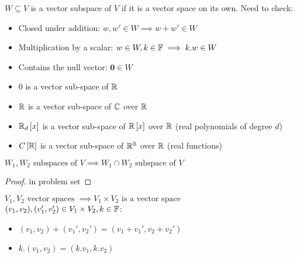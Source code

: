 \begin{definition}
	$W \subseteq V$ is a vector subspace of $V$ if it is a vector space on its own.
	Need to check:
	\begin{itemize}
		\item Closed under addition: $w,w' \in W \implies w+w' \in W$
		\item Multiplication by a scalar: $w \in W, k \in \mathbb{F} \implies k.w \in W$
		\item Contains the null vector: $\textbf{0} \in W$
	\end{itemize}
\end{definition}
\begin{example}
	\begin{itemize}
		\item $0$ is a vector sub-space of $\mathbb{R}$
		\item $\mathbb{R}$ is a vector sub-space of $\mathbb{C}$ over $\mathbb{R}$
		\item $\mathbb{R}_d\left[x\right]$ is a vector sub-space of $\mathbb{R}\left[x\right]$ over $\mathbb{R}$ (real polynomials of degree $d$)
		\item $C\left[ \mathbb{R}\right]$ is a vector sub-space of $\mathbb{R}^{\mathbb{R}}$ over $\mathbb{R}$ (real functions)
	\end{itemize}
\end{example}
\begin{proposition}
	$W_1, W_2 \text{ subspaces of } V \implies W_1 \cap W_2 \text{ subspace of } V$
\end{proposition}
\begin{proof}
	in problem set
\end{proof}

\begin{property}
	$V_1, V_2 \text{ vector spaces } \implies V_1 \times V_2 \text{ is a vector space}$\\
	$(v_1,v_2),(v_1',v_2') \in V_1 \times V_2, k \in \mathbb{F}$:
	\begin{itemize}
		\item $(v_1,v_2)+(v_1',v_2')=(v_1+v_1',v_2+v_2')$
		\item $k.(v_1,v_2)=(k.v_1,k.v_2)$
	\end{itemize}
\end{property}

